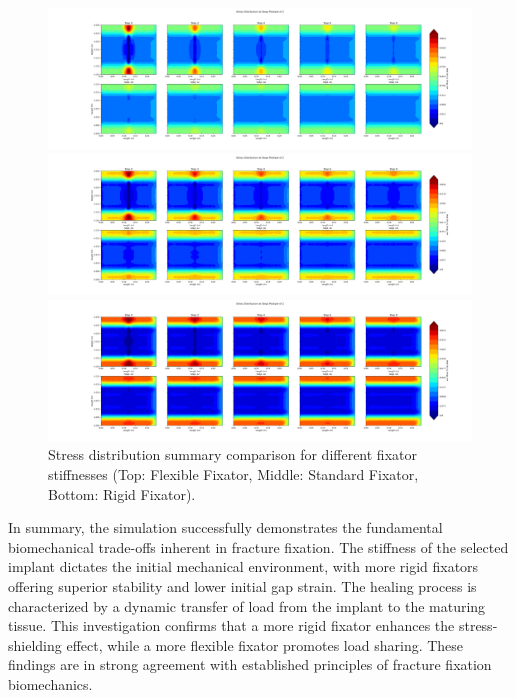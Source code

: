 \documentclass{article}
\begin{document}
\begin{figure}[htbp]
  \centering
  \begin{minipage}{\textwidth}
    \centering
    \includegraphics[width=\textwidth]{../output_advanced/Flexible/stress_summary.png}
  \end{minipage}

  \begin{minipage}{\textwidth}
    \centering
    \includegraphics[width=\textwidth]{../output_advanced/Standard/stress_summary.png}
  \end{minipage}

  \begin{minipage}{\textwidth}
    \centering
    \includegraphics[width=\textwidth]{../output_advanced/Rigid/stress_summary.png}
  \end{minipage}

  \caption{Stress distribution summary comparison for different fixator stiffnesses (Top: Flexible Fixator, Middle: Standard Fixator, Bottom: Rigid Fixator).}
  \label{fig:stress_summary_comparison}
\end{figure}

In summary, the simulation successfully demonstrates the fundamental biomechanical trade-offs inherent in fracture fixation. The stiffness of the selected implant dictates the initial mechanical environment, with more rigid fixators offering superior stability and lower initial gap strain. The healing process is characterized by a dynamic transfer of load from the implant to the maturing tissue. This investigation confirms that a more rigid fixator enhances the stress-shielding effect, while a more flexible fixator promotes load sharing. These findings are in strong agreement with established principles of fracture fixation biomechanics.
\end{document}
